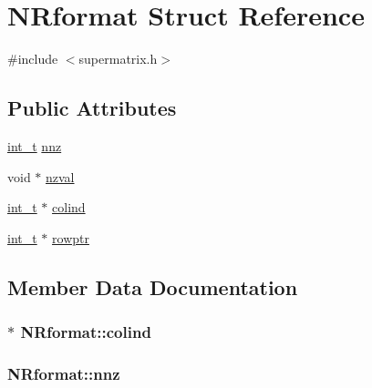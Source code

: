 \hypertarget{structNRformat}{}\section{N\+Rformat Struct Reference}
\label{structNRformat}


{\ttfamily \#include $<$supermatrix.\+h$>$}

\subsection*{Public Attributes}
\begin{DoxyCompactItemize}
\item 
\hyperlink{slu__cdefs_8h_ab6fd6105e64ed14a0c9281326f05e623}{int\+\_\+t} \hyperlink{structNRformat_ae3652d6a08cf47208db6abbd162bdee2}{nnz}
\item 
void $\ast$ \hyperlink{structNRformat_a3933d6611dc87efede947b08ea8d83f2}{nzval}
\item 
\hyperlink{slu__cdefs_8h_ab6fd6105e64ed14a0c9281326f05e623}{int\+\_\+t} $\ast$ \hyperlink{structNRformat_a25b76fc1f79b314a99c1e8f8522d77af}{colind}
\item 
\hyperlink{slu__cdefs_8h_ab6fd6105e64ed14a0c9281326f05e623}{int\+\_\+t} $\ast$ \hyperlink{structNRformat_a552302eb293088d4b7040f487b430ba7}{rowptr}
\end{DoxyCompactItemize}


\subsection{Member Data Documentation}
\hypertarget{structNRformat_a25b76fc1f79b314a99c1e8f8522d77af}{}
\subsubsection[{colind}]{$\ast$ N\+Rformat\+::colind}\label{structNRformat_a25b76fc1f79b314a99c1e8f8522d77af}
\hypertarget{structNRformat_ae3652d6a08cf47208db6abbd162bdee2}{}
\subsubsection[{nnz}]{ N\+Rformat\+::nnz}\label{structNRformat_ae3652d6a08cf47208db6abbd162bdee2}
\hypertarget{structNRformat_a3933d6611dc87efede947b08ea8d83f2}{}
